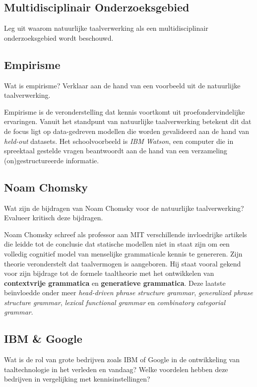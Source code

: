 \documentclass[../main.tex]{subfiles}
\begin{document}
\subsection{Multidisciplinair Onderzoeksgebied}
\begin{question}
Leg uit waarom natuurlijke taalverwerking als een multidisciplinair onderzoeksgebied wordt beschouwd.
\end{question}

\subsection{Empirisme}
\begin{question}
Wat is empirisme? Verklaar aan de hand van een voorbeeld uit de natuurlijke taalverwerking.
\end{question}

\begin{solution}
Empirisme is de veronderstelling dat kennis voortkomt uit proefondervindelijke ervaringen.
Vanuit het standpunt van natuurlijke taalverwerking betekent dit dat de focus ligt op data-gedreven modellen die worden gevalideerd aan de hand van \emph{held-out} datasets.
Het schoolvoorbeeld is \emph{IBM Watson}, een computer die in spreektaal gestelde vragen beantwoordt aan de hand van een verzameling (on)gestructureerde informatie.
\end{solution}

\subsection{Noam Chomsky}
\begin{question}
Wat zijn de bijdragen van Noam Chomsky voor de natuurlijke taalverwerking?
Evalueer kritisch deze bijdragen.
\end{question}

\begin{solution}
Noam Chomsky schreef als professor aan MIT verschillende invloedrijke artikels die leidde tot de conclusie dat statische modellen niet in staat zijn om een volledig cognitief model van menselijke grammaticale kennis te genereren.
Zijn theorie veronderstelt dat taalvermogen is aangeboren.
Hij staat vooral gekend voor zijn bijdrage tot de formele taaltheorie met het ontwikkelen van \textbf{contextvrije grammatica} en \textbf{generatieve grammatica}. Deze laatste beïnvloedde onder meer \emph{head-driven phrase structure grammar}, \emph{generalized phrase structure grammar}, \emph{lexical functional grammar} en \emph{combinatory categorial grammar}.
\end{solution}

\subsection{IBM \& Google}
\begin{question}
Wat is de rol van grote bedrijven zoals IBM of Google in de ontwikkeling van taaltechnologie in het verleden en vandaag?
Welke voordelen hebben deze bedrijven in vergelijking met kennisinstellingen?
\end{question}
\end{document}
